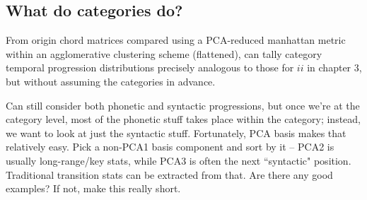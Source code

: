 


\subsection{What do categories do?}
From origin chord matrices compared using a PCA-reduced manhattan metric within an agglomerative clustering scheme (flattened), can tally category temporal progression distributions precisely analogous to those for $ii$ in chapter 3, but without assuming the categories in advance.

Can still consider both phonetic and syntactic progressions, but once we're at the category level, most of the phonetic stuff takes place within the category; instead, we want to look at just the syntactic stuff.  Fortunately, PCA basis makes that relatively easy.  Pick a non-PCA1 basis component and sort by it -- PCA2 is usually long-range/key stats, while PCA3 is often the next ``syntactic" position.  Traditional transition stats can be extracted from that.  Are there any good examples?  If not, make this really short.

